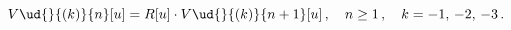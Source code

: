 \begin{equation}\label{eq:recNeg}
V\ud{}{(k)}{n}[u] = R[u] \cdot V\ud{}{(k)}{n+1}[u]\,,\quad {{n}} \geq
1\,,\quad {{k} = -1,\,-2,\,-3}\,.
\end{equation}

